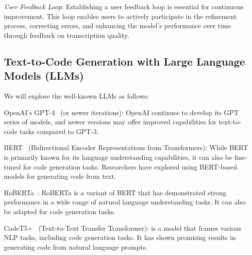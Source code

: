 {\em User Feedback Loop}: Establishing a user feedback loop is essential for
continuous improvement. This loop enables users to actively
participate in the refinement process, correcting errors, and
enhancing the model's performance over time through feedback on
transcription quality.

\subsection{Text-to-Code Generation with Large Language Models (LLMs)}



We will explore the well-known LLMs as follows:

OpenAI's GPT-4~\cite{GPT} (or newer iterations): OpenAI continues to develop its GPT series of models, and newer versions may offer improved capabilities for text-to-code tasks compared to GPT-3.

BERT~\cite{devlin2019bert} (Bidirectional Encoder Representations from
Transformers): While BERT is primarily known for its language
understanding capabilities, it can also be fine-tuned for code
generation tasks. Researchers have explored using BERT-based models
for generating code from text.

RoBERTa~\cite{liu2019roberta}: RoBERTa is a variant of BERT that has demonstrated strong performance in a wide range of natural language understanding tasks. It can also be adapted for code generation tasks.

CodeT5+~\cite{wang2023codet5} (Text-to-Text Transfer Transformer): is
a model that frames various NLP tasks, including code generation
tasks. It has shown promising results in generating code from natural
language prompts.


